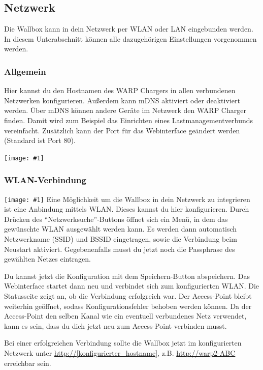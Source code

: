 \documentclass[a4paper,10pt]{article}
\newcommand{\gfx}[1]{\texttt{[image: \#1]}}
\begin{document}
\begin{multicols*}{2}
    \subsection{Netzwerk}\label{network}
    Die Wallbox kann in dein Netzwerk per WLAN oder LAN eingebunden werden.
    In diesem Unterabschnitt können alle dazugehörigen Einstellungen vorgenommen werden.

    \subsubsection{Allgemein}
    Hier kannst du den Hostnamen des WARP Chargers in allen verbundenen Netzwerken konfigurieren. Außerdem kann mDNS aktiviert oder deaktiviert werden.
    Über mDNS können andere Geräte im Netzwerk den WARP Charger finden. Damit
    wird zum Beispiel das Einrichten eines Lastmanagementverbunds vereinfacht.
    Zusätzlich kann der Port für das Webinterface geändert werden (Standard ist
    Port 80).

    \gfx{./img_warp2/resized/web_network}


    \subsubsection{WLAN-Verbindung}
    \gfx{./img_warp2/resized/web_wifi_sta}
    Eine Möglichkeit um die Wallbox in dein Netzwerk zu integrieren ist eine
    Anbindung mittels WLAN. Dieses kannst du hier konfigurieren.
    Durch Drücken des \enquote{Netzwerksuche}-Buttons öffnet sich ein Menü, in dem das gewünschte WLAN ausgewählt werden kann.
    Es werden dann automatisch Netzwerkname (SSID) und BSSID eingetragen, sowie die Verbindung beim Neustart aktiviert.
    Gegebenenfalls musst du jetzt noch die Passphrase des gewählten Netzes eintragen.

    \vspace{-0.1cm}
    Du kannst jetzt die Konfiguration mit dem Speichern-Button abspeichern.
    Das Webinterface startet dann neu und verbindet sich zum konfigurierten WLAN. Die Statusseite zeigt
    an, ob die Verbindung erfolgreich war. Der Access-Point bleibt weiterhin
    geöffnet, sodass Konfigurationsfehler behoben werden können.
    Da der Access-Point den selben Kanal wie ein eventuell verbundenes Netz verwendet,
    kann es sein, dass du dich jetzt neu zum Access-Point verbinden musst.

    \vspace{-0.1cm}
    Bei einer erfolgreichen Verbindung sollte die Wallbox jetzt im konfigurierten Netzwerk unter
    \url{http://[konfigurierter_hostname]}, z.B. \url{http://warp2-ABC} erreichbar sein.


\end{multicols*}
\end{document}
